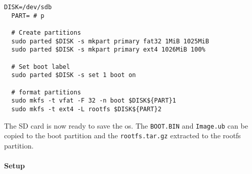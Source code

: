 \begin{lstlisting}[style=bash, caption={Prepair SD card}, label=lst:create_partitions]
  DISK=/dev/sdb
  PART= # p

  # Create partitions
  sudo parted $DISK -s mkpart primary fat32 1MiB 1025MiB
  sudo parted $DISK -s mkpart primary ext4 1026MiB 100%

  # Set boot label
  sudo parted $DISK -s set 1 boot on

  # format partitions
  sudo mkfs -t vfat -F 32 -n boot $DISK${PART}1
  sudo mkfs -t ext4 -L rootfs $DISK${PART}2
\end{lstlisting}

The SD card is now ready to save the \acrshort{os}.
The \texttt{BOOT.BIN} and \texttt{Image.ub} can be copied to the boot partition and the \texttt{rootfs.tar.gz} extracted to the rootfs partition.

\paragraph{Setup}
